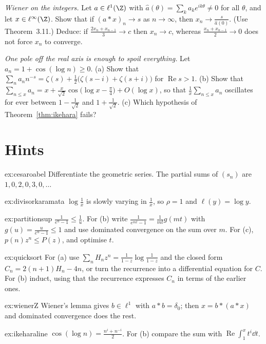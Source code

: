 \begin{exercise}[$\star$]\label{ex:wienerZ}
\emph{Wiener on the integers.} Let $a\in\ell^1(\Z)$ with $\hat a(\theta)=\sum_ka_ke^{ik\theta}\ne0$ for all $\theta$, and let $x\in\ell^\infty(\Z)$. Show that if
$(a*x)_n\to s$ as $n\to\infty$, then $x_n\to\frac s{\hat a(0)}$. (Use Theorem~3.11.) Deduce: if $\frac{2x_n+x_{n-1}}3\to c$ then $x_n\to c$, whereas
$\frac{x_n+x_{n-1}}2\to0$ does not force $x_n$ to converge.
\end{exercise}

\begin{exercise}[$\star\star$]\label{ex:ikeharaline}
\emph{One pole off the real axis is enough to spoil everything.} Let $a_n=1+\cos(\log n)\ge0$. (a) Show that
$\sum_na_nn^{-s}=\zeta(s)+\frac12\bigl(\zeta(s-i)+\zeta(s+i)\bigr)$ for $\operatorname{Re}s>1$. (b) Show that
$\sum_{n\le x}a_n=x+\frac x{\sqrt2}\cos\bigl(\log x-\frac\pi4\bigr)+O(\log x)$, so that $\frac1x\sum_{n\le x}a_n$ oscillates for ever between $1-\frac1{\sqrt2}$
and $1+\frac1{\sqrt2}$. (c) Which hypothesis of Theorem~\ref{thm:ikehara} fails?
\end{exercise}

\section{Hints}

\begin{hint}{ex:cesaroabel}
Differentiate the geometric series. The partial sums of $(s_n)$ are $1,0,2,0,3,0,\dots$
\end{hint}
\begin{hint}{ex:divisorkaramata}
$\log\frac1x$ is slowly varying in $\frac1x$, so $\rho=1$ and $\ell(y)=\log y$.
\end{hint}
\begin{hint}{ex:partitionsup}
$\frac1{e^u-1}\le\frac1u$. For (b) write $\frac1{e^{mt}-1}=\frac1{mt}g(mt)$ with $g(u)=\frac u{e^u-1}\le1$ and use dominated convergence on the sum over $m$. For
(c), $p(n)z^n\le P(z)$, and optimise $t$.
\end{hint}
\begin{hint}{ex:quicksort}
For (a) use $\sum_nH_nz^n=\frac1{1-z}\log\frac1{1-z}$ and the closed form $C_n=2(n+1)H_n-4n$, or turn the recurrence into a differential equation for $C$. For
(b) induct, using that the recurrence expresses $C_n$ in terms of the earlier ones.
\end{hint}
\begin{hint}{ex:wienerZ}
Wiener's lemma gives $b\in\ell^1$ with $a*b=\delta_0$; then $x=b*(a*x)$ and dominated convergence does the rest.
\end{hint}
\begin{hint}{ex:ikeharaline}
$\cos(\log n)=\frac{n^i+n^{-i}}2$. For (b) compare the sum with $\operatorname{Re}\int_1^xt^i\dd t$.
\end{hint}

